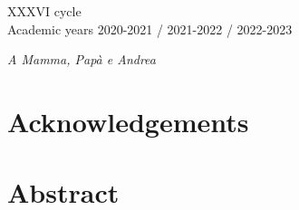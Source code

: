 \documentclass[b5paper, 10 pt, twoside]{book}
\numberwithin{equation}{section}
\theoremstyle{plain}
\theoremstyle{definition}
\theoremstyle{definition}
\theoremstyle{remark}
\begin{document}
\begin{titlepage}
\begin{center}
\end{center}

\vfill
\vspace{0.7cm}

\begin{center}
XXXVI cycle \\
Academic years 2020-2021 / 2021-2022 / 2022-2023
\end{center}
\end{titlepage}

\frontmatter

\newpage
\mainmatter

\clearpage
\begin{flushright}
    \thispagestyle{empty}
    \vspace*{\fill}
    {\em A Mamma, Papà e Andrea\\}
    \vspace*{\fill}
\end{flushright}
\clearpage

\chapter*{Acknowledgements}
%
\pagestyle{fancy}
\fancyhf{}
\renewcommand{\chaptermark}[1]{\markboth{\thechapter.\ #1}{}}
\renewcommand{\sectionmark}[1]{\markright{\thesection\ #1}}
\fancyhead[LE,RO]{\thepage}
\fancyhead[CE]{\nouppercase{\leftmark}}
\fancyhead[CO]{\nouppercase{\rightmark}}



\clearpage{\pagestyle{empty}\cleardoublepage}

\chapter*{Abstract}
%




\clearpage{\pagestyle{empty}\cleardoublepage}

\tableofcontents

\clearpage{\pagestyle{empty}\cleardoublepage}





\pagestyle{fancy}
\fancyhf{}
\renewcommand{\chaptermark}[1]{\markboth{\thechapter.\ #1}{}}
\renewcommand{\sectionmark}[1]{\markright{\thesection\ #1}}
\fancyhead[LE,RO]{\thepage}
\fancyhead[CE]{}
\fancyhead[CO]{}
\setlength\parindent{0pt}
\end{document}
